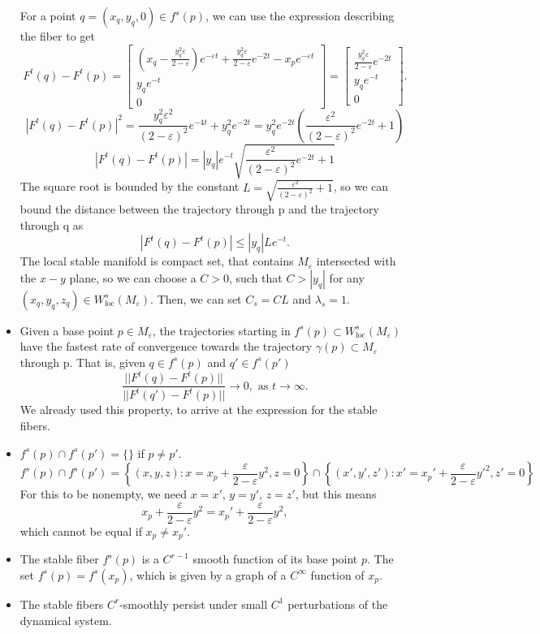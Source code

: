 \documentclass[a4paper,11pt,pdftex]{article}
\begin{document}
\begin{itemize}
    For a point $q=(x_q,y_q,0) \in f^s(p)$, we can use the expression describing the fiber to get
    $$
    F^t(q)-F^t(p) = \begin{bmatrix}
\left(x_q - \frac{y_q^2 \varepsilon}{2-\varepsilon}\right)e^{-\varepsilon t} + \frac{y_q^2 \varepsilon }{2-\varepsilon}e^{-2t} - x_p e^{-\varepsilon t}\\
y_q e^{-t} \\
0
\end{bmatrix} = \begin{bmatrix}
\frac{y_q^2 \varepsilon }{2-\varepsilon}e^{-2t}\\
y_q e^{-t} \\
0
\end{bmatrix}.
    $$
    $$
    |F^t(q)-F^t(p)|^2 = \frac{y_q^2\varepsilon^2}{(2-\varepsilon)^2}e^{-4t} + y_q^2 e^{-2t} = y_q^2e^{-2t}\left( \frac{\varepsilon^2}{(2-\varepsilon)^2}e^{-2t} +1 \right)
    $$
    $$
    |F^t(q)-F^t(p)| = |y_q|e^{-t}\sqrt{ \frac{\varepsilon^2}{(2-\varepsilon)^2}e^{-2t} +1}
    $$
    The square root is bounded by the constant $L = \sqrt{\frac{\varepsilon^2}{(2-\varepsilon)^2} + 1}$, so we can bound the distance between the trajectory through p and the trajectory through q as
    $$
    |F^t(q)-F^t(p)| \leq |y_q|L e^{-t}. 
    $$
    The local stable manifold is compact set, that contains $M_\varepsilon$ intersected with the $x-y$ plane, so we can choose a $C>0$, such that $C>|y_q|$ for any $(x_q,y_q,z_q)\in W^s_\text{loc}(M_\varepsilon)$.  
    Then, we can set $C_s =CL$ and $\lambda_s = 1$. 
    
\item Given a base point $p\in M_\varepsilon$, the trajectories starting in $f^s(p)\subset W^s_{\text{loc}}(M_\varepsilon) $ have the fastest rate of convergence towards the trajectory $\gamma(p)\subset M_\varepsilon$ through p. That is, given $q\in f^s(p)$ and $q'\in f^s(p')$
\begin{equation*}
\label{cond}
    \frac{||F^t(q) - F^t(p)||}{||F^t(q') - F^t(p)||}\to 0, \text{ as } t\to \infty.
\end{equation*}
We already used this property, to arrive at the expression for the stable fibers.

\item $f^s(p)\cap f^s(p') = \{ \}$ if $p\neq p'$. 
$$
f^s(p)\cap f^s(p') = \left\{ (x,y,z): x = x_p+ \frac{\varepsilon}{2-\varepsilon}y^2, z=0 \right\} \cap \left\{ (x',y',z'): x' = x_p'+ \frac{\varepsilon}{2-\varepsilon}y'^2, z'=0 \right\}
$$
For this to be nonempty, we need $x=x'$, $y=y'$, $z=z'$, but this means
$$
x_p + \frac{\varepsilon}{2-\varepsilon}y^2 = x_p'+ \frac{\varepsilon}{2-\varepsilon}y^2,
$$
which cannot be equal if $x_p\neq x_p'$. 
\item The stable fiber $f^s(p)$ is a $C^{r-1}$ smooth function of its base point $p$. 
The set $f^s(p)=f^s(x_p)$, which is given by a graph of a $C^\infty$ function of $x_p$.
\item The stable fibers $C^r$-smoothly persist under small $C^1$ perturbations of the dynamical system.


\end{itemize}
\end{document}
